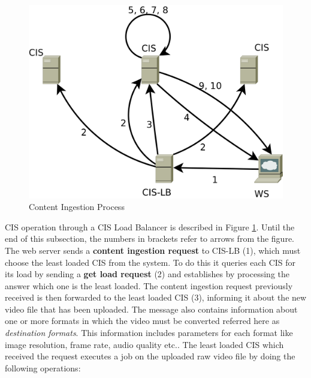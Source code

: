 \begin{figure}[h]
  \begin{center}
    \includegraphics[width=\columnwidth]{img/content-ingestion.png}
  \end{center}
  \caption{Content Ingestion Process}
  \label{fig:content-ingestion}
\end{figure}

CIS operation through a CIS Load Balancer is described in Figure \ref{fig:content-ingestion}. Until the end of this subsection, the numbers in brackets refer to arrows from the figure. The web server sends a \textbf{content ingestion request} to CIS-LB (1), which must choose the least loaded CIS from the system. To do this it queries each CIS for its load by sending a \textbf{get load request} (2) and establishes by processing the answer which one is the least loaded. The content ingestion request previously received is then forwarded to the least loaded CIS (3), informing it about the new video file that has been uploaded. The message also contains information about one or more formats in which the video must be converted referred here as \textit{destination formats}. This information includes parameters for each format like image resolution, frame rate, audio quality etc.. The least loaded CIS which received the request executes a job on the uploaded raw video file by doing the following operations:


